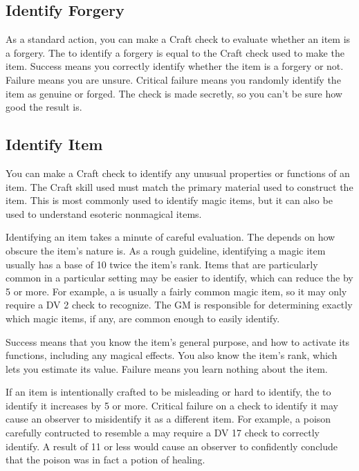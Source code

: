     \subsection{Identify Forgery}
        As a standard action, you can make a Craft check to evaluate whether an item is a forgery. The  to identify a forgery is equal to the Craft check used to make the item. Success means you correctly identify whether the item is a forgery or not. Failure means you are unsure. Critical failure means you randomly identify the item as genuine or forged. The check is made secretly, so you can't be sure how good the result is.

    \subsection{Identify Item}
        You can make a Craft check to identify any unusual properties or functions of an item.
        The Craft skill used must match the primary material used to construct the item.
        This is most commonly used to identify magic items, but it can also be used to understand esoteric nonmagical items.

        Identifying an item takes a minute of careful evaluation.
        The  depends on how obscure the item's nature is.
        As a rough guideline, identifying a magic item usually has a base  of 10 \add twice the item's rank.
        Items that are particularly common in a particular setting may be easier to identify, which can reduce the  by 5 or more.
        For example, a  is usually a fairly common magic item, so it may only require a DV 2 check to recognize.
        The GM is responsible for determining exactly which magic items, if any, are common enough to easily identify.

        Success means that you know the item's general purpose, and how to activate its functions, including any magical effects.
        You also know the item's rank, which lets you estimate its value.
        Failure means you learn nothing about the item.

        If an item is intentionally crafted to be misleading or hard to identify, the  to identify it increases by 5 or more.
        Critical failure on a check to identify it may cause an observer to misidentify it as a different item.
        For example, a poison carefully contructed to resemble a  may require a DV 17 check to correctly identify.
        A result of 11 or less would cause an observer to confidently conclude that the poison was in fact a potion of healing.


